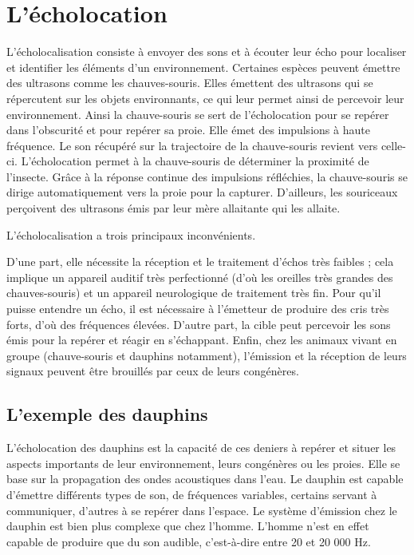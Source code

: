 \section{L'écholocation}

L'écholocalisation consiste à envoyer des sons et à écouter leur écho
pour localiser et identifier les éléments d'un environnement. Certaines
espèces peuvent émettre des ultrasons comme les chauves-souris. Elles
émettent des ultrasons qui se répercutent sur les objets environnants,
ce qui leur permet ainsi de percevoir leur environnement. Ainsi la
chauve-souris se sert de l'écholocation pour se repérer dans l'obscurité
et pour repérer sa proie. Elle émet des impulsions à haute fréquence. Le
son récupéré sur la trajectoire de la chauve-souris revient vers
celle-ci. L'écholocation permet à la chauve-souris de déterminer la
proximité de l'insecte. Grâce à la réponse continue des impulsions
réfléchies, la chauve-souris se dirige automatiquement vers la proie
pour la capturer. D'ailleurs, les souriceaux perçoivent des ultrasons
émis par leur mère allaitante qui les allaite.

L'écholocalisation a trois principaux inconvénients.

D'une part, elle nécessite la réception et le traitement d'échos très
faibles ; cela implique un appareil auditif très perfectionné (d'où les
oreilles très grandes des chauves-souris) et un appareil neurologique de
traitement très fin. Pour qu'il puisse entendre un écho, il est
nécessaire à l'émetteur de produire des cris très forts, d'où des
fréquences élevées. D'autre part, la cible peut percevoir les sons émis
pour la repérer et réagir en s'échappant. Enfin, chez les animaux vivant
en groupe (chauve-souris et dauphins notamment), l'émission et la
réception de leurs signaux peuvent être brouillés par ceux de leurs
congénères.

\subsection{L'exemple des dauphins}

L'écholocation des dauphins est la capacité de ces deniers à repérer et
situer les aspects importants de leur environnement, leurs congénères ou
les proies. Elle se base sur la propagation des ondes acoustiques dans
l'eau. Le dauphin est capable d'émettre différents types de son, de
fréquences variables, certains servant à communiquer, d'autres à se
repérer dans l'espace. Le système d'émission chez le dauphin est bien
plus complexe que chez l'homme. L'homme n'est en effet capable de
produire que du son audible, c'est-à-dire entre 20 et 20 000 Hz.


